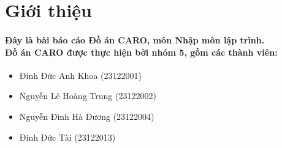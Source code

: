 \section{Giới thiệu}
\paragraph{Đây là bài báo cáo Đồ án CARO, môn Nhập môn lập trình.\\ Đồ án CARO được thực hiện bởi nhóm 5, gồm các thành viên:}

\begin{itemize}
    \item Đinh Đức Anh Khoa (23122001)
    \item Nguyễn Lê Hoàng Trung (23122002)
    \item Nguyễn Đình Hà Dương (23122004)
    \item Đinh Đức Tài (23122013)
\end{itemize}